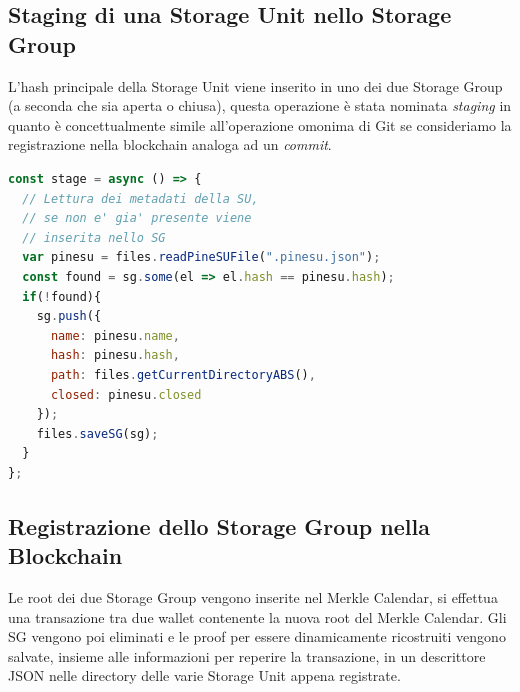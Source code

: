 \subsection{Staging di una Storage Unit nello Storage Group}
\label{sub:stage2}
L'hash principale della Storage Unit viene inserito in uno dei due Storage Group (a seconda che sia aperta o chiusa), questa operazione è stata nominata \emph{staging} in quanto è concettualmente simile all'operazione omonima di Git se consideriamo la registrazione nella blockchain analoga ad un \emph{commit}.
\\
\begin{lstlisting}[language=JavaScript]
const stage = async () => {
  // Lettura dei metadati della SU,
  // se non e' gia' presente viene
  // inserita nello SG
  var pinesu = files.readPineSUFile(".pinesu.json");
  const found = sg.some(el => el.hash == pinesu.hash);
  if(!found){
    sg.push({
      name: pinesu.name,
      hash: pinesu.hash,
      path: files.getCurrentDirectoryABS(),
      closed: pinesu.closed
    });
    files.saveSG(sg);
  }
};
\end{lstlisting}

\subsection{Registrazione dello Storage Group nella Blockchain}
Le root dei due Storage Group vengono inserite nel Merkle Calendar, si effettua una transazione tra due wallet contenente la nuova root del Merkle Calendar.
Gli SG vengono poi eliminati e le proof per essere dinamicamente ricostruiti vengono salvate, insieme alle informazioni per reperire la transazione, in un descrittore JSON nelle directory delle varie Storage Unit appena registrate.

\newpage

